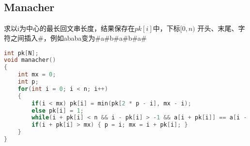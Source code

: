 ﻿\subsection{Manacher}
\paragraph{}
求以i为中心的最长回文串长度，结果保存在$pk[i]$中，下标$[0, n)$
开头、末尾、字符之间插入\#，例如ababa变为\#a\#b\#a\#b\#a\#
	\begin{lstlisting}[language=C++]	
int pk[N];
void manacher()
{
    int mx = 0;
    int p;
    for(int i = 0; i < n; i++)
    {
        if(i < mx) pk[i] = min(pk[2 * p - i], mx - i);
        else pk[i] = 1;
        while(i + pk[i] < n && i - pk[i] > -1 && a[i + pk[i]] == a[i - pk[i]]) pk[i]++;
        if(i + pk[i] > mx) { p = i; mx = i + pk[i]; }
    }
}
	\end{lstlisting}